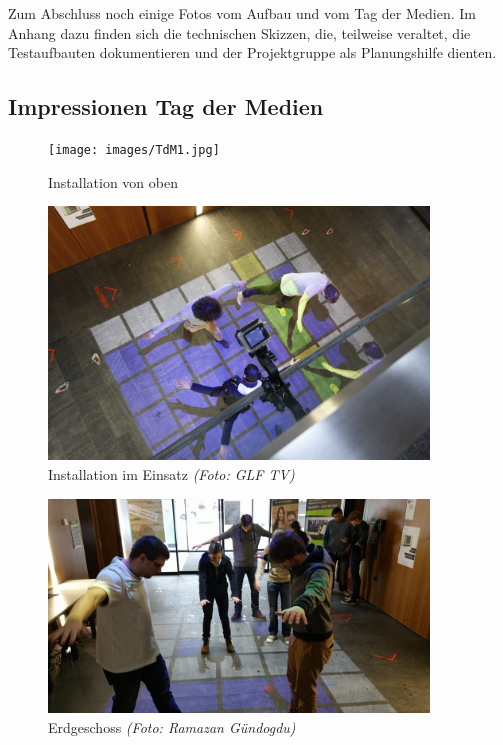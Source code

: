 
\clearpage
{}

Zum Abschluss noch einige Fotos vom Aufbau und vom Tag der Medien. Im Anhang dazu finden sich die technischen Skizzen, die, teilweise veraltet, die Testaufbauten dokumentieren und der Projektgruppe als Planungshilfe dienten.

\subsection{Impressionen Tag der Medien}

\begin{figure}[htbp]
	\centering
		\texttt{[image: images/TdM1.jpg]}
	\caption{Installation von oben}
	\label{fig:TdM1}
\end{figure}

\begin{figure}[htbp]
	\centering
		\includegraphics[width=0.9\textwidth]{images/TdM5.jpg}
	\caption{Installation im Einsatz \textit{(Foto: GLF TV)}}
	\label{fig:TdM5}
\end{figure}

\begin{figure}[htbp]
	\centering
		\includegraphics[width=0.9\textwidth]{images/TdM2.jpg}
	\caption{Erdgeschoss \textit{(Foto: Ramazan Gündogdu)}}
	\label{fig:TdM2}
\end{figure}

